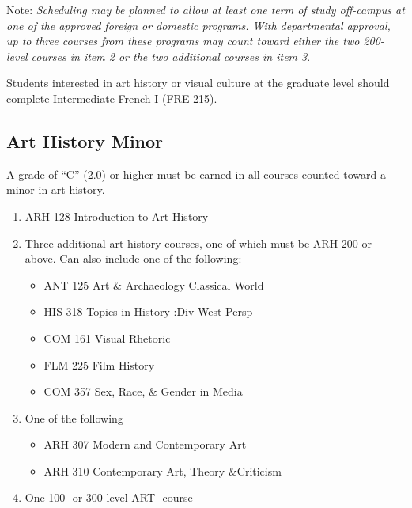 \documentclass[
  letterpaper,
]{scrbook}
\providecommand{\tightlist}{%
  \setlength{\itemsep}{0pt}\setlength{\parskip}{0pt}}
\begin{document}
Note: \emph{Scheduling may be planned to allow at least one term of
study off-campus at one of the approved foreign or domestic programs.
With departmental approval, up to three courses from these programs may
count toward either the two 200-level courses in item 2 or the two
additional courses in item 3}.

Students interested in art history or visual culture at the graduate
level should complete Intermediate French I (FRE-215).

\subsection{Art History Minor}\label{art-history-minor}

A grade of ``C'' (2.0) or higher must be earned in all courses counted
toward a minor in art history.

\begin{enumerate}
\def\labelenumi{\arabic{enumi}.}
\tightlist
\item
  ARH 128 Introduction to Art History\\
\item
  Three additional art history courses, one of which must be ARH-200 or
  above. Can also include one of the following:

  \begin{itemize}
  \tightlist
  \item
    ANT 125 Art \& Archaeology Classical World\\
  \item
    HIS 318 Topics in History :Div West Persp\\
  \item
    COM 161 Visual Rhetoric\\
  \item
    FLM 225 Film History\\
  \item
    COM 357 Sex, Race, \& Gender in Media\\
  \end{itemize}
\item
  One of the following

  \begin{itemize}
  \tightlist
  \item
    ARH 307 Modern and Contemporary Art
  \item
    ARH 310 Contemporary Art, Theory \&Criticism\\
  \end{itemize}
\item
  One 100- or 300-level ART- course
\end{enumerate}
\end{document}
